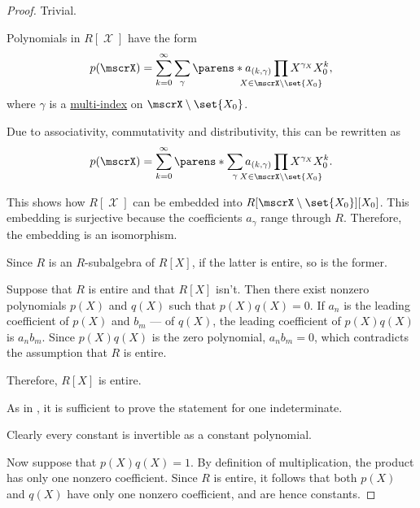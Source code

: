 \begin{proof}
   Trivial.

   Polynomials in \( R[\mscrX] \) have the form
  \begin{equation*}
    p(\mscrX) = \sum_{k=0}^\infty \sum_\gamma \parens*{ a_{(k,\gamma)} \prod_{\mathclap{X \in \mscrX \setminus \set{ X_0 }}} X^{\gamma_X} } X_0^k,
  \end{equation*}
  where \( \gamma \) is a \hyperref[def:multi_index]{multi-index} on \( \mscrX \setminus \set{ X_0 } \).

  Due to associativity, commutativity and distributivity, this can be rewritten as
  \begin{equation*}
    p(\mscrX) = \sum_{k=0}^\infty \parens*{ \sum_\gamma a_{(k,\gamma)} \prod_{\mathclap{X \in \mscrX \setminus \set{ X_0 }}} X^{\gamma_X} } X_0^k.
  \end{equation*}

  This shows how \( R[\mscrX] \) can be embedded into \( R[\mscrX \setminus \set{ X_0 }][X_0] \). This embedding is surjective because the coefficients \( a_\gamma \) range through \( R \). Therefore, the embedding is an isomorphism.


  \SufficiencySubProof Since \( R \) is an \( R \)-subalgebra of \( R[X] \), if the latter is entire, so is the former.

  \NecessitySubProof Suppose that \( R \) is entire and that \( R[X] \) isn't. Then there exist nonzero polynomials \( p(X) \) and \( q(X) \) such that \( p(X) q(X) = 0 \). If \( a_n \) is the leading coefficient of \( p(X) \) and \( b_m \) --- of \( q(X) \), the leading coefficient of \( p(X) q(X) \) is \( a_n b_m \). Since \( p(X) q(X) \) is the zero polynomial, \( a_n b_m = 0 \), which contradicts the assumption that \( R \) is entire.

  Therefore, \( R[X] \) is entire.

   As in , it is sufficient to prove the statement for one indeterminate.

  Clearly every constant is invertible as a constant polynomial.

  Now suppose that \( p(X) q(X) = 1 \). By definition of multiplication, the product has only one nonzero coefficient. Since \( R \) is entire, it follows that both \( p(X) \) and \( q(X) \) have only one nonzero coefficient, and are hence constants.
\end{proof}

